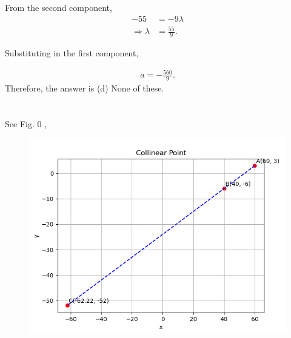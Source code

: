 \documentclass[journal]{IEEEtran}
\begin{document}
From the second component,
\begin{align}
-55 &= -9\lambda \\
\Rightarrow \lambda &= \frac{55}{9}.
\end{align}

Substituting in the first component,

\begin{align}
a = -\frac{560}{9}.
\end{align}
Therefore, the answer is (d) None of these.\\\\\\
\newpage
See Fig. 0 ,
\begin{figure}[H]
\begin{center}
\includegraphics[width=0.6\columnwidth]{figs/fig.png}
\end{center}
\caption{}
\label{fig:Fig1}
\end{figure}
\end{document}

